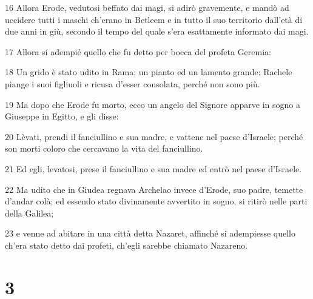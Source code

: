 \par 16 Allora Erode, vedutosi beffato dai magi, si adirò gravemente, e mandò ad uccidere tutti i maschi ch'erano in Betleem e in tutto il suo territorio dall'età di due anni in giù, secondo il tempo del quale s'era esattamente informato dai magi.
\par 17 Allora si adempié quello che fu detto per bocca del profeta Geremia:
\par 18 Un grido è stato udito in Rama; un pianto ed un lamento grande: Rachele piange i suoi figliuoli e ricusa d'esser consolata, perché non sono più.
\par 19 Ma dopo che Erode fu morto, ecco un angelo del Signore apparve in sogno a Giuseppe in Egitto, e gli disse:
\par 20 Lèvati, prendi il fanciullino e sua madre, e vattene nel paese d'Israele; perché son morti coloro che cercavano la vita del fanciullino.
\par 21 Ed egli, levatosi, prese il fanciullino e sua madre ed entrò nel paese d'Israele.
\par 22 Ma udito che in Giudea regnava Archelao invece d'Erode, suo padre, temette d'andar colà; ed essendo stato divinamente avvertito in sogno, si ritirò nelle parti della Galilea;
\par 23 e venne ad abitare in una città detta Nazaret, affinché si adempiesse quello ch'era stato detto dai profeti, ch'egli sarebbe chiamato Nazareno.

\chapter{3}

